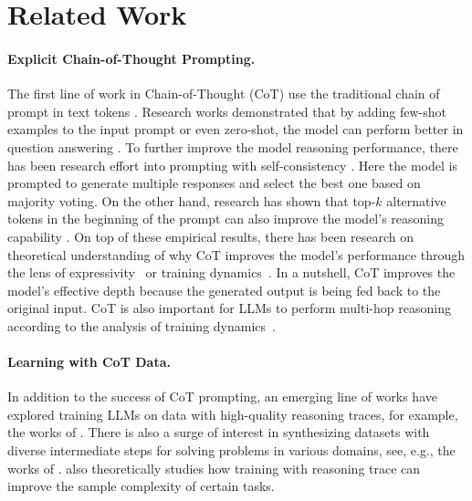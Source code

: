 \section{Related Work}
\label{sec:related}

\paragraph{Explicit Chain-of-Thought Prompting.} The first line of work in Chain-of-Thought (CoT) use the traditional chain of prompt in text tokens \citep{cot1, cot2}.  Research works demonstrated that by adding few-shot examples to the input prompt or even zero-shot, the model can perform better in question answering \citep{prompt1, kojima2022large, chung2024scaling}.
To further improve the model reasoning performance, there has been research effort into prompting with self-consistency \citep{ss1}. Here the model is prompted to generate multiple responses and select the best one based on majority voting. On the other hand, research has shown that top-$k$ alternative tokens in the beginning of the prompt can also improve the model's reasoning capability \cite{wang2024chainofthoughtreasoningprompting}. 
On top of these empirical results, there has been research on theoretical understanding of why CoT improves the model's performance through the lens of expressivity~\citep{feng2024towards, li2024chainthoughtempowerstransformers} or training dynamics~\citep{cot_dynamics_1}. In a nutshell, CoT improves the model's effective depth because the generated output is being fed back to the original input. CoT is also important for LLMs to perform multi-hop reasoning according to the analysis of training dynamics~\citep{cot_dynamics_1}.





   

\paragraph{Learning with CoT Data.} In addition to the success of CoT prompting,
an emerging line of works have explored training LLMs on data with high-quality reasoning traces, for example, the works of \citet{nye2021show, azerbayev2023llemma, lehnert2024beyond, su2024dualformer, yu2024distilling, yang2024qwen2, deng2023implicit, deng2024explicit}.
There is also a surge of interest in synthesizing datasets with diverse intermediate steps for solving problems in various domains, see, e.g.,  
the works of \citet{kim2023cot, tong2024dart, yu2023metamath, yue2023mammoth, lozhkov2024finemath}. \citet{cot_dynamics_2} also theoretically studies how training with reasoning trace can improve the sample complexity of certain tasks.




